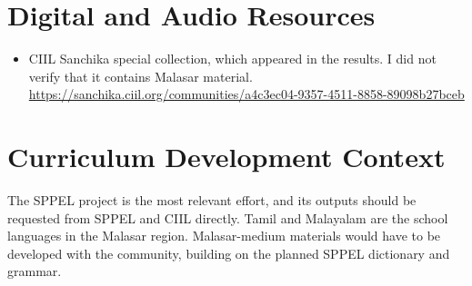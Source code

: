 \documentclass[12pt]{article}
\begin{document}
\section{Digital and Audio Resources}
\begin{itemize}
\item CIIL Sanchika special collection, which appeared in the results. I did not verify that it contains Malasar material. \url{https://sanchika.ciil.org/communities/a4c3ec04-9357-4511-8858-89098b27bceb}
\end{itemize}

\section{Curriculum Development Context}
The SPPEL project is the most relevant effort, and its outputs should be requested from SPPEL and CIIL directly. Tamil and Malayalam are the school languages in the Malasar region. Malasar-medium materials would have to be developed with the community, building on the planned SPPEL dictionary and grammar.
\end{document}
